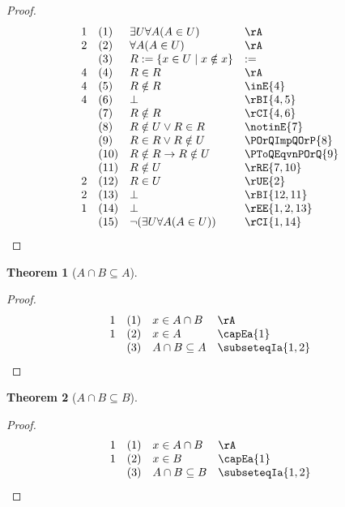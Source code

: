 \documentclass{book}
\theoremstyle{plain}
\newtheorem{theorem}{Theorem}
\theoremstyle{remark}
\theoremstyle{definition}
\begin{document}
\begin{proof}
	\[
	\begin{array}{llll}
		1 & (1) & \exists U \forall A (A \in U) & \rA \\
		2 & (2) & \forall A (A \in U) & \rA \\
		& (3) & R:=\{x\in U\mid x\notin x\} & := \\
		4 & (4) & R\in R & \rA \\
		4 & (5) & R\notin R & \inE{4} \\  
		4 & (6) & \bot & \rBI{4,5} \\  
		& (7) & R\notin R & \rCI{4,6}  \\  
		& (8) & R\notin U\lor R\in R & \notinE{7}  \\
		& (9) & R\in R\lor R\notin U &  \POrQImpQOrP{8} \\
		& (10) & R\notin R\rightarrow R\notin U & \PToQEqvnPOrQ{9}  \\
		& (11) & R\notin U & \rRE{7,10} \\
		2 & (12) & R\in U & \rUE{2} \\
		2 & (13) & \bot & \rBI{12,11} \\	
		1 & (14) & \bot & \rEE{1,2,13} \\	
		& (15) & \neg(\exists U \forall A (A \in U)) & \rCI{1,14} \\									  			  
	\end{array}
	\]
\end{proof}

\label{AcaBSubseteqA}
\begin{theorem}[\(A \cap B \subseteq A\)]
\end{theorem}
\begin{proof}
    \[
        \begin{array}{llll}
		1 & (1) & x \in A \cap B & \rA \\
		1 & (2) & x \in A & \capEa{1} \\
		& (3) & A \cap B \subseteq A & \subseteqIa{1,2} \\
	\end{array}
    \]
\end{proof}

\label{AcaBSubseteqB}
\begin{theorem}[\(A \cap B \subseteq B\)]
\end{theorem}
\begin{proof}
    \[
	\begin{array}{llll}
	   1 & (1) & x \in A \cap B & \rA \\
	   1 & (2) & x \in B & \capEa{1} \\
	    & (3) & A \cap B \subseteq B & \subseteqIa{1,2} \\
	\end{array}
    \]
\end{proof}
\end{document}
